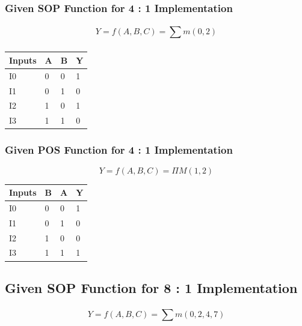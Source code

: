 \documentclass[11pt]{article}
\begin{document}
\subsubsection{Given SOP Function for 4 : 1 Implementation}
$$
	Y = f(A, B, C) = \displaystyle\sum_{}^{} m(0, 2)
$$

\begin{table}[H]
	\begin{tabular}{|l|l|l|l|}
		\hline
		\textbf{Inputs} & \textbf{A} & \textbf{B} & \textbf{Y} \\ \hline
		I0              & 0          & 0          & 1          \\ \hline
		I1              & 0          & 1          & 0          \\ \hline
		I2              & 1          & 0          & 1          \\ \hline
		I3              & 1          & 1          & 0          \\ \hline
	\end{tabular}
\end{table}
\subsubsection{Given POS Function for 4 : 1 Implementation}
$$
	Y = f(A, B, C) = \displaystyle\Pi M(1, 2)
$$

\begin{table}[H]
	\begin{tabular}{|l|l|l|l|}
		\hline
		\textbf{Inputs} & \textbf{B} & \textbf{A} & \textbf{Y} \\ \hline
		I0              & 0          & 0          & 1          \\ \hline
		I1              & 0          & 1          & 0          \\ \hline
		I2              & 1          & 0          & 0          \\ \hline
		I3              & 1          & 1          & 1          \\ \hline
	\end{tabular}
\end{table}
\subsection{Given SOP Function for 8 : 1 Implementation }
$$
	Y = f(A, B, C) = \displaystyle\sum_{}^{} m(0, 2, 4, 7)
$$
\end{document}
